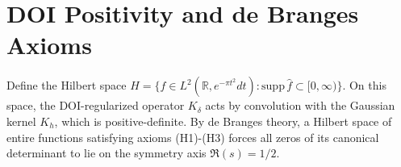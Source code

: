 \section{DOI Positivity and de Branges Axioms}
Define the Hilbert space $H = \{f \in L^2(\mathbb{R}, e^{-\pi t^2}dt) : \mathrm{supp}\,\hat{f} \subset [0,\infty)\}$. On this space, the DOI-regularized operator $K_\delta$ acts by convolution with the Gaussian kernel $K_h$, which is positive-definite. By de Branges theory, a Hilbert space of entire functions satisfying axioms (H1)-(H3) forces all zeros of its canonical determinant to lie on the symmetry axis $\Re(s) = 1/2$.